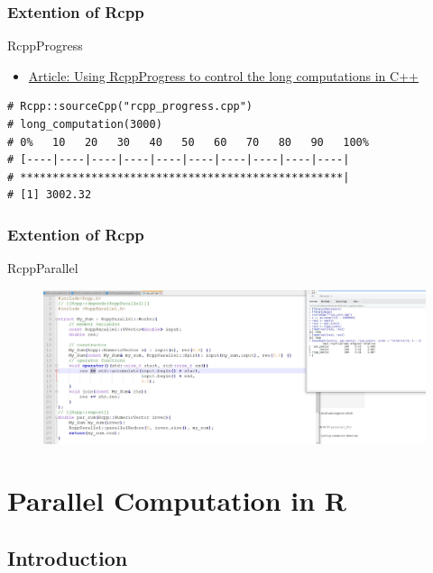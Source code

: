 \documentclass[aspectratio=169,xcolor={dvipsnames,table}]{beamer}
\begin{document}
\begin{frame}[fragile]
  \frametitle{Extention of Rcpp}
  \begin{block}{RcppProgress}
    \begin{itemize}
    \item \href{https://gallery.rcpp.org/articles/using-rcppprogress/}{Article: Using RcppProgress to control the long computations in C++}
    \end{itemize}
\begin{verbatim}
# Rcpp::sourceCpp("rcpp_progress.cpp")
# long_computation(3000)
# 0%   10   20   30   40   50   60   70   80   90   100%
# [----|----|----|----|----|----|----|----|----|----|
# **************************************************|
# [1] 3002.32
\end{verbatim}
  \end{block}
\end{frame}

\begin{frame}
  \frametitle{Extention of Rcpp}
  \begin{block}{RcppParallel}
    \begin{figure}[htbp]
    \centering
    \includegraphics[width = \textwidth]{rcpp_parallel}
  \end{figure}
  \end{block}
\end{frame}

\section{Parallel Computation in R}

\subsection{Introduction}
\end{document}
